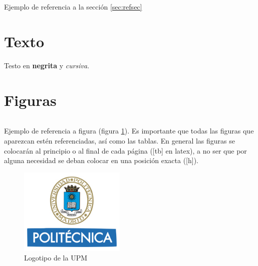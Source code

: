 Ejemplo de referencia a la sección \ref{sec:refsec}

\section{Texto}

Testo en \textbf{negrita} y \textit{cursiva}.

\section{Figuras}


\begin{longtable}[c]{|c|c|c|c|}
\end{longtable}

Ejemplo de referencia a figura (figura \ref{fig:logo_upm}). Es importante que todas las figuras que aparezcan estén referenciadas, así como las tablas. En general las figuras se colocarán al principio o al final de cada página ([tb] en latex), a no ser que por alguna necesidad se deban colocar en una posición exacta ([h]).

\begin{figure}[tb]
\centering
\includegraphics[width=0.45\textwidth]{figuras/Logo_UPM.jpg}   
\caption{Logotipo de la UPM}
\label{fig:logo_upm}
\end{figure}